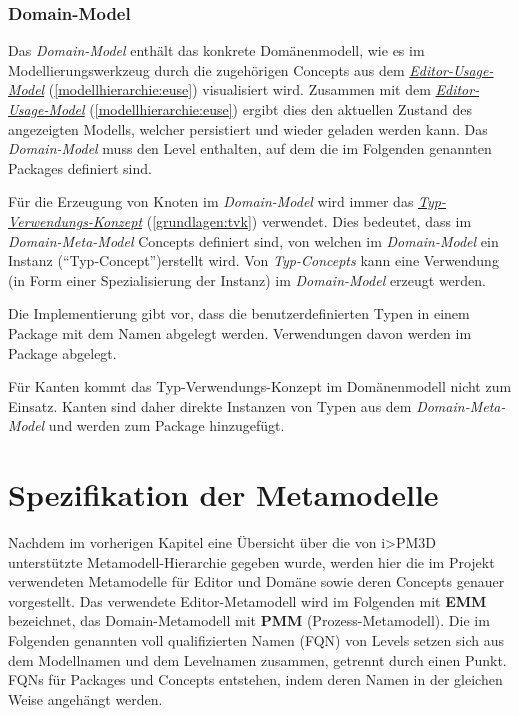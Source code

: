 \documentclass[a4paper,10pt]{sphinxmanual}
\begin{document}
\subsection{Domain-Model}
\label{modellhierarchie:domain-model}\label{modellhierarchie:id8}
Das \emph{Domain-Model} enthält das konkrete Domänenmodell, wie es im Modellierungswerkzeug durch die zugehörigen Concepts aus dem {\hyperref[modellhierarchie:euse]{\emph{Editor-Usage-Model}}} (\autoref*{modellhierarchie:euse}) visualisiert wird.
Zusammen mit dem {\hyperref[modellhierarchie:euse]{\emph{Editor-Usage-Model}}} (\autoref*{modellhierarchie:euse}) ergibt dies den aktuellen Zustand des angezeigten Modells, welcher persistiert und wieder geladen werden kann.
Das \emph{Domain-Model} muss den Level  enthalten, auf dem die im Folgenden genannten Packages definiert sind.

Für die Erzeugung von Knoten im \emph{Domain-Model} wird immer das {\hyperref[grundlagen:tvk]{\emph{Typ-Verwendungs-Konzept}}} (\autoref*{grundlagen:tvk}) verwendet.
Dies bedeutet, dass im \emph{Domain-Meta-Model} Concepts definiert sind, von welchen im \emph{Domain-Model} ein Instanz ("`Typ-Concept"')erstellt wird.
Von \emph{Typ-Concepts} kann eine Verwendung (in Form einer Spezialisierung der Instanz) im \emph{Domain-Model} erzeugt werden.

Die Implementierung gibt vor, dass die benutzerdefinierten Typen in einem Package mit dem Namen  abgelegt werden.
Verwendungen davon werden im Package  abgelegt.

Für Kanten kommt das Typ-Verwendungs-Konzept im Domänenmodell nicht zum Einsatz.
Kanten sind daher direkte Instanzen von Typen aus dem \emph{Domain-Meta-Model} und werden zum Package  hinzugefügt.


\chapter{Spezifikation der Metamodelle}
\label{metamodelle:metamodelle}\label{metamodelle:spezifikation-der-metamodelle}\label{metamodelle::doc}
Nachdem im vorherigen Kapitel eine Übersicht über die von i\textgreater{}PM3D unterstützte Metamodell-Hierarchie gegeben wurde, werden hier die im Projekt verwendeten Metamodelle für Editor und Domäne sowie deren Concepts genauer vorgestellt.
Das verwendete Editor-Metamodell wird im Folgenden mit \textbf{EMM} bezeichnet, das Domain-Metamodell mit \textbf{PMM} (Prozess-Metamodell).
Die im Folgenden genannten voll qualifizierten Namen (FQN) von Levels setzen sich aus dem Modellnamen und dem Levelnamen zusammen, getrennt durch einen Punkt.
FQNs für Packages und Concepts entstehen, indem deren Namen in der gleichen Weise angehängt werden.
\end{document}
